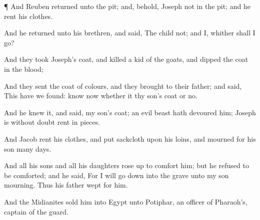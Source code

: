 {\par }{\PP {}¶ And
Reuben
returned unto the
pit; and, behold,
Joseph
{} not in the
pit; and he
rent his
clothes.

And he
returned unto his
brethren, and
said, The
child
{} not; and I,
whither shall I
go?


\par }{\PP {}And they
took
Joseph’s
coat, and
killed a
kid of the
goats, and
dipped the
coat in the
blood;

And they
sent the
coat of
{}
colours, and they
brought
{} to their
father; and
said, This have we
found:
know now whether it
{} thy
son’s
coat or no.

And he knew
it, and
said,
{} my
son’s
coat; an
evil
beast hath
devoured him;
Joseph is without
doubt rent in
pieces.

And
Jacob
rent his
clothes, and
put
sackcloth upon his
loins, and
mourned for his
son
many
days.

And all his
sons and all his
daughters rose
up to
comfort him; but he
refused to be
comforted; and he
said, For I will go
down into the
grave unto my
son
mourning. Thus his
father
wept for him.

And the
Midianites
sold him into
Egypt unto
Potiphar, an
officer of
Pharaoh’s,
{}
captain of the
guard.




\par }
